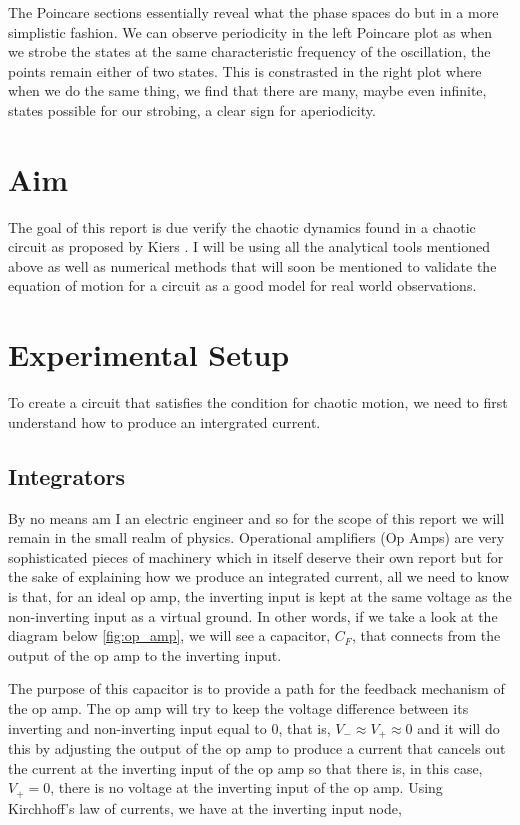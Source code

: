 \documentclass[aps,prl,reprint,10pt,amsmath,amssymb,superscriptaddress,a4paper]{revtex4-2}
\begin{document}
The Poincare sections essentially reveal what the phase spaces do but in a more simplistic fashion. We can observe periodicity in the left Poincare plot as when we strobe the states at the same characteristic frequency of the 
oscillation, the points remain either of two states. This is constrasted in the right plot where when we do the same thing, we find that there are many, maybe even infinite, states possible for our strobing, a clear sign for 
aperiodicity.

\section{Aim}

The goal of this report is due verify the chaotic dynamics found in a chaotic circuit as proposed by Kiers \citep{kiers}. I will be using all the analytical tools mentioned above as well as numerical methods that will soon be 
mentioned to validate the equation of motion for a circuit as a good model for real world observations.

\section{Experimental Setup}

To create a circuit that satisfies the condition for chaotic motion, we need to first understand how to produce an intergrated current. 

\subsection{Integrators}

By no means am I an electric engineer and so for the scope of this report we will remain in the small realm of physics. Operational amplifiers (Op Amps) are very sophisticated pieces of machinery which in itself deserve their 
own report but for the sake of explaining how we produce an integrated current, all we need to know is that, for an ideal op amp, the inverting input is kept at the same voltage as the non-inverting input as a virtual 
ground. In other words, if we take a look at the diagram below \ref{fig:op_amp}, we will see a capacitor, $C_F$, that connects from the output of the op amp to the inverting input.

The purpose of this capacitor is to provide a path for the feedback mechanism of the op amp. The op amp will try to keep the voltage difference between its inverting and non-inverting input equal to 0, that is, $V_{-} \approx 
V_{+} \approx 0$ and it will do this by adjusting the output of the op amp to produce a current that cancels out the current at the inverting input of the op amp so that there is, in this case, $V_{+} = 0$, there is no 
voltage at the inverting input of the op amp. Using Kirchhoff's law of currents, we have at the inverting input node,
\end{document}
